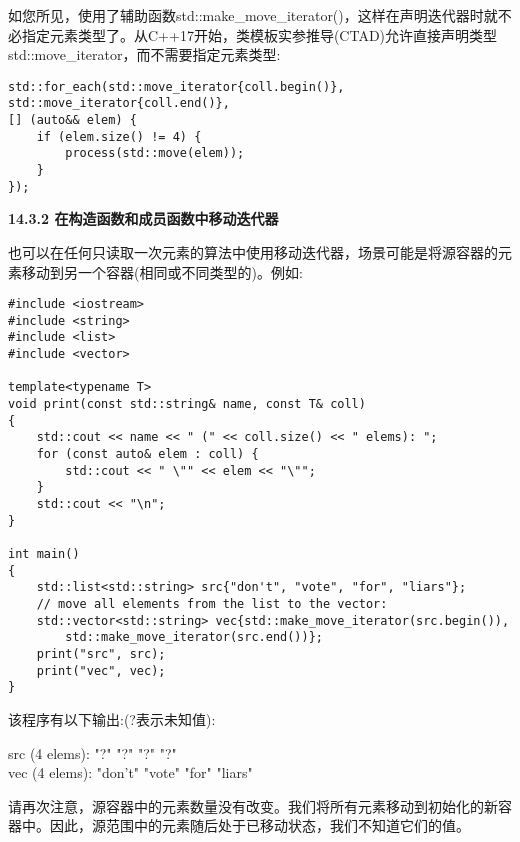 如您所见，使用了辅助函数std::make\_move\_iterator()，这样在声明迭代器时就不必指定元素类型了。从C++17开始，类模板实参推导(CTAD)允许直接声明类型std::move\_iterator，而不需要指定元素类型:\par

\begin{lstlisting}[caption={}]
std::for_each(std::move_iterator{coll.begin()},
std::move_iterator{coll.end()},
[] (auto&& elem) {
	if (elem.size() != 4) {
		process(std::move(elem));
	}
});
\end{lstlisting}

\hspace*{\fill} \par %
\textbf{14.3.2 在构造函数和成员函数中移动迭代器}

也可以在任何只读取一次元素的算法中使用移动迭代器，场景可能是将源容器的元素移动到另一个容器(相同或不同类型的)。例如:\par

{\color{red}{lib/moveitor.cpp}}\par

\begin{lstlisting}[caption={}]
#include <iostream>
#include <string>
#include <list>
#include <vector>

template<typename T>
void print(const std::string& name, const T& coll)
{
	std::cout << name << " (" << coll.size() << " elems): ";
	for (const auto& elem : coll) {
		std::cout << " \"" << elem << "\"";
	}
	std::cout << "\n";
}

int main()
{
	std::list<std::string> src{"don't", "vote", "for", "liars"};
	// move all elements from the list to the vector:
	std::vector<std::string> vec{std::make_move_iterator(src.begin()),
		std::make_move_iterator(src.end())};
	print("src", src);
	print("vec", vec);
}
\end{lstlisting}

该程序有以下输出:(?表示未知值):\par

\begin{tcolorbox}[colback=white,colframe=black]
src (4 elems): "?" "?" "?" "?" \\
vec (4 elems): "don't" "vote" "for" "liars"
\end{tcolorbox}

请再次注意，源容器中的元素数量没有改变。我们将所有元素移动到初始化的新容器中。因此，源范围中的元素随后处于已移动状态，我们不知道它们的值。\par













